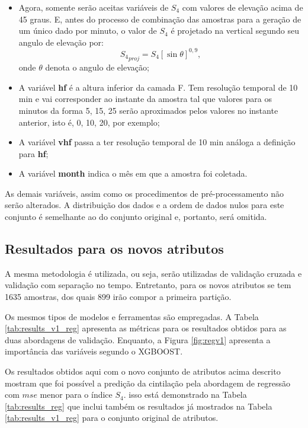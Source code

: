 \begin{itemize}
\item Agora, somente serão aceitas variáveis de $S_4$ com valores de elevação acima de 45 graus. E, antes do processo de combinação das amostras para a geração de um único dado por minuto, o valor de $S_4$ é projetado na vertical segundo seu angulo de elevação por:
\begin{equation}
{S_4}_{proj}=S_4[\sin\theta]^{0,9}\mbox{,}~
\end{equation}
onde $\theta$ denota o angulo de elevação;
\item A variável {\bf hf} é a altura inferior da camada F. Tem resolução temporal de 10 min e vai corresponder ao instante da amostra tal que valores para os minutos da forma 5, 15, 25 serão aproximados pelos valores no instante anterior, isto é, 0, 10, 20, por exemplo;
\item A variável {\bf vhf} passa a ter resolução temporal de 10 min análoga a definição para {\bf hf};
\item A variável {\bf month} indica o mês em que a amostra foi coletada.
\end{itemize}

As demais variáveis, assim como os procedimentos de pré-processamento não serão alterados. A distribuição dos dados e a ordem de dados nulos para este conjunto é semelhante ao do conjunto original e, portanto, será omitida.

\subsection{Resultados para os novos atributos}

A mesma metodologia é utilizada, ou seja, serão utilizadas de validação cruzada e validação com separação no tempo. Entretanto, para os novos atributos se tem 1635 amostras, dos quais 899 irão compor a primeira partição.

Os mesmos tipos de modelos e ferramentas são empregadas. A Tabela \ref{tab:results_v1_reg} apresenta as métricas para os resultados obtidos para as duas abordagens de validação. Enquanto, a Figura \ref{fig:regv1} apresenta a importância das variáveis segundo o XGBOOST.

Os resultados obtidos aqui com o novo conjunto de atributos acima descrito mostram que foi possível a predição da cintilação pela abordagem de regressão com $mse$ menor para o índice $S_4$. isso está demonstrado na Tabela \ref{tab:results_reg} que inclui também os resultados já mostrados na Tabela \ref{tab:results_v1_reg} para o conjunto original de atributos.


